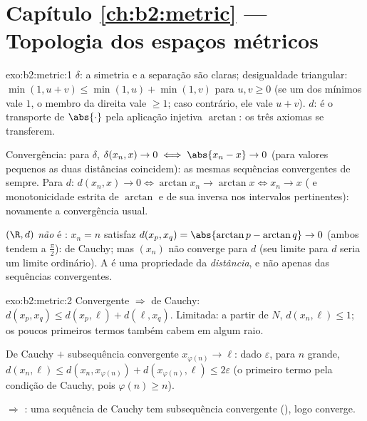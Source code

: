 \section*{Capítulo \ref{ch:b2:metric} --- Topologia dos espaços métricos}

\begin{solution}{exo:b2:metric:1}
$\delta$: a simetria e a separação são claras; desigualdade triangular:
$\min(1, u + v) \leq \min(1,u) + \min(1,v)$ para $u, v \geq 0$ (se
um dos mínimos vale $1$, o membro da direita vale $\geq 1$; caso contrário, ele vale $u + v$).
$d$: é o transporte de $\abs{\cdot}$ pela aplicação injetiva $\arctan$:
os três axiomas se transferem.

Convergência: para $\delta$, $\delta(x_n, x) \to 0 \iff \abs{x_n - x}
\to 0$ (para valores pequenos as duas distâncias coincidem): as mesmas sequências
convergentes de sempre. Para $d$: $d(x_n, x) \to 0 \iff \arctan x_n \to
\arctan x \iff x_n \to x$ ( e monotonicidade estrita de
$\arctan$ e de sua inversa nos intervalos pertinentes): novamente a
convergência usual.

$(\R, d)$ \emph{não} é : $x_n = n$ satisfaz $d(x_p, x_q)
= \abs{\arctan p - \arctan q} \to 0$ (ambos tendem a $\frac\pi2$):
de Cauchy; mas $(x_n)$ não converge para $d$ (seu limite para $d$ seria
um limite ordinário). A  é uma propriedade da
\emph{distância}, e não apenas das sequências convergentes.
\end{solution}

\begin{solution}{exo:b2:metric:2}
Convergente $\Rightarrow$ de Cauchy: $d(x_p, x_q) \leq d(x_p, \ell) +
d(\ell, x_q)$. Limitada: a partir de $N$, $d(x_n, \ell) \leq 1$; os
poucos primeiros termos também cabem em algum raio.

De Cauchy $+$ subsequência convergente $x_{\varphi(n)} \to \ell$: dado
$\varepsilon$, para $n$ grande, $d(x_n, \ell) \leq d(x_n,
x_{\varphi(n)}) + d(x_{\varphi(n)}, \ell) \leq 2\varepsilon$ (o
primeiro termo pela condição de Cauchy, pois $\varphi(n) \geq n$).

 $\Rightarrow$ : uma sequência de Cauchy tem subsequência
convergente (), logo converge.
\end{solution}

